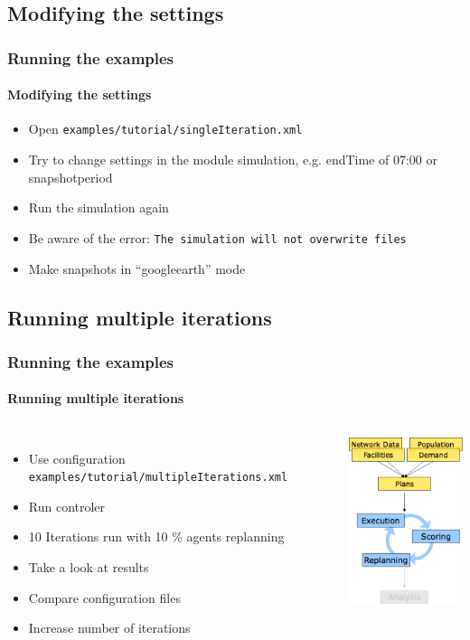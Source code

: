 \subsection{Modifying the settings}

\begin{frame}[fragile]
\frametitle{Running the examples}
\framesubtitle{Modifying the settings}

\begin{itemize}
  \item Open \verb|examples/tutorial/singleIteration.xml|
  \item Try to change settings in the module simulation, e.g. endTime of 07:00 or snapshotperiod
  \item Run the simulation again
  \item Be aware of the error: \verb|The simulation will not overwrite files|
  \item Make snapshots in ``googleearth'' mode
\end{itemize}
\end{frame}


\subsection{Running multiple iterations}

\begin{frame}[fragile]
\frametitle{Running the examples}
\framesubtitle{Running multiple iterations}

\begin{columns}[T]

\column{7cm}

\begin{itemize}
  \item Use configuration \verb|examples/tutorial/multipleIterations.xml|
  \item Run controler
  \item 10 Iterations run with 10 \%  agents replanning
  \item Take a look at results
  \item Compare configuration files
  \item Increase number of iterations
\end{itemize}

\column{5cm}
\includegraphics[width=4cm]{../graphics/overviewMatsimIterations.png}

\end{columns}

\end{frame}

